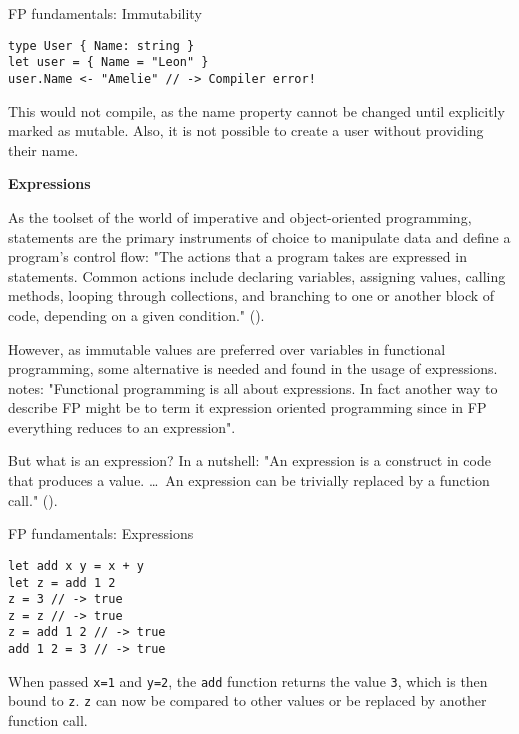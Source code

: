 \begin{listing}[H]
\caption{FP fundamentals: Immutability}
\begin{verbatim}
type User { Name: string }
let user = { Name = "Leon" }
user.Name <- "Amelie" // -> Compiler error!
\end{verbatim}
\end{listing}

This would not compile, as the name property cannot be changed until explicitly marked as mutable. Also, it is not possible to create a user without providing their name.

\textbf{Expressions}

As the toolset of the world of imperative and object-oriented programming, statements are the primary instruments of choice to manipulate data and define a program's control flow: "The actions that a program takes are expressed in statements. Common actions include declaring variables, assigning values, calling methods, looping through collections, and branching to one or another block of code, depending on a given condition." (\cite{microsoft_statements_2015}).

However, as immutable values are preferred over variables in functional programming, some alternative is needed and found in the usage of expressions. \cite{gauld_learning_nodate} notes: "Functional programming is all about expressions. In fact another way to describe FP might be to term it expression oriented programming since in FP everything reduces to an expression".

But what is an expression? In a nutshell: "An expression is a construct in code that produces a value. \dots\ An expression can be trivially replaced by a function call." (\cite{microsoft_introduction_2018}).

\begin{listing}[H]
\caption{FP fundamentals: Expressions}
\begin{verbatim}
let add x y = x + y
let z = add 1 2
z = 3 // -> true
z = z // -> true
z = add 1 2 // -> true
add 1 2 = 3 // -> true
\end{verbatim}
\end{listing}

When passed \texttt{x=1} and \texttt{y=2}, the \texttt{add} function returns the value \texttt{3}, which is then bound to \texttt{z}. \texttt{z} can now be compared to other values or be replaced by another function call.

